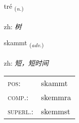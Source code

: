 \documentclass[frontgrid, backgrid]{flacards}\usepackage[]{graphicx}\usepackage[]{color}
\begin{document}
\renewcommand{\flhead}{\vskip5pt \fboxsep=0pt {\small\bfseries\footnotesize Nafnorð | 名词}}
\renewcommand{\fcfoot}{\vskip5pt \fboxsep=0pt \hspace{2pt}{\small\bfseries\footnotesize 2K}}

\renewcommand{\blhead}{\vskip5pt {\small\bfseries\footnotesize Nafnorð | 名词 }}
\renewcommand{\bcfoot}{\vskip5pt \hspace{2pt}{\small\bfseries\footnotesize 2K}}


{tré \small{\textsubscript{(\textit{n.})}} \\[1ex] %
\textphonetic{[tʰrjɛː]} \\
zh: \emph{树} \\  [2ex]
\renewcommand*{\arraystretch}{0.8}
}

\renewcommand{\flhead}{\vskip5pt \fboxsep=0pt {\small\bfseries\footnotesize Atviksorð | 副词}}
\renewcommand{\fcfoot}{\vskip5pt \fboxsep=0pt \hspace{2pt}{\small\bfseries\footnotesize 2K}}

\renewcommand{\blhead}{\vskip5pt {\small\bfseries\footnotesize Atviksorð | 副词 }}
\renewcommand{\bcfoot}{\vskip5pt \hspace{2pt}{\small\bfseries\footnotesize 2K}}


{skammt \small{\textsubscript{(\textit{adv.})}} \\[1ex] %
\textphonetic{[skam̥t]} \\
zh: \emph{短，短时间} \\  [2ex]
\renewcommand*{\arraystretch}{0.8}
\begin{tabular}{ll}
\textsc{pos}: & skammt \\ 
\textsc{comp.}: & skemmra \\ 
\textsc{superl.}: & skemmst \\
\end{tabular}
}
\end{document}
